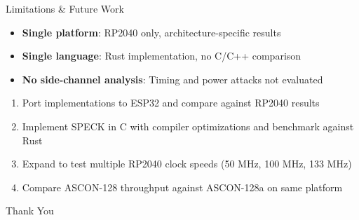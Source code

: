 \documentclass[aspectratio=169]{beamer}
\begin{document}
\begin{frame}{Limitations \& Future Work}
\textbf{}
\begin{itemize}
    \item \textbf{Single platform}: RP2040 only, architecture-specific results
    \item \textbf{Single language}: Rust implementation, no C/C++ comparison
    \item \textbf{No side-channel analysis}: Timing and power attacks not evaluated
\end{itemize}

\vspace{0.2cm}
\textbf{}
\begin{enumerate}
    \item Port implementations to ESP32 and compare against RP2040 results
    \item Implement SPECK in C with compiler optimizations and benchmark against Rust
    \item Expand to test multiple RP2040 clock speeds (50 MHz, 100 MHz, 133 MHz)
    \item Compare ASCON-128 throughput against ASCON-128a on same platform
\end{enumerate}
\end{frame}

\begin{frame}[plain]
\begin{center}
\Huge Thank You
\end{center}
\end{frame}
\end{document}
